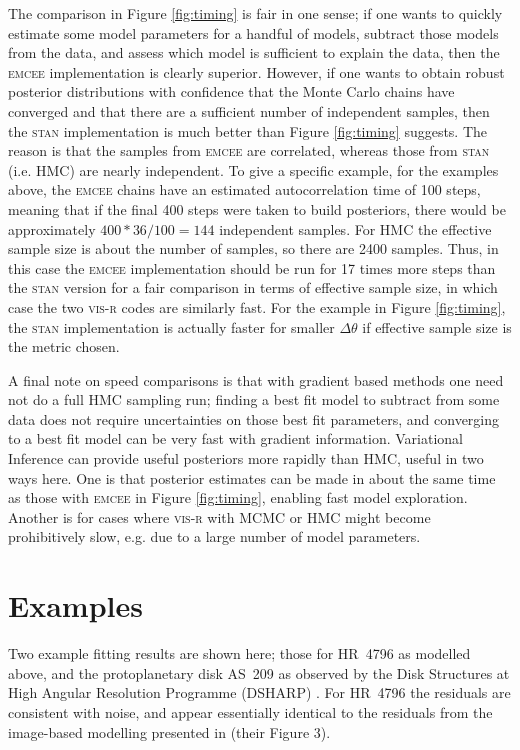 \documentclass[fleqn,usenatbib]{rasti}
\begin{document}
The comparison in Figure \ref{fig:timing} is fair in one sense; if one wants to quickly estimate some model parameters for a handful of models, subtract those models from the data, and assess which model is sufficient to explain the data, then the \textsc{emcee} implementation is clearly superior. However, if one wants to obtain robust posterior distributions with confidence that the Monte Carlo chains have converged and that there are a sufficient number of independent samples, then the \textsc{stan} implementation is much better than Figure \ref{fig:timing} suggests. The reason is that the samples from \textsc{emcee} are correlated, whereas those from \textsc{stan} (i.e. HMC) are nearly independent. To give a specific example, for the examples above, the \textsc{emcee} chains have an estimated autocorrelation time of 100 steps, meaning that if the final 400 steps were taken to build posteriors, there would be approximately $400*36/100=144$ independent samples. For HMC the effective sample size is about the number of samples, so there are 2400 samples. Thus, in this case the \textsc{emcee} implementation should be run for 17 times more steps than the \textsc{stan} version for a fair comparison in terms of effective sample size, in which case the two \textsc{vis-r} codes are similarly fast. For the example in Figure \ref{fig:timing}, the \textsc{stan} implementation is actually faster for smaller $\Delta \theta$ if effective sample size is the metric chosen.

A final note on speed comparisons is that with gradient based methods one need not do a full HMC sampling run; finding a best fit model to subtract from some data does not require uncertainties on those best fit parameters, and converging to a best fit model can be very fast with gradient information. Variational Inference can provide useful posteriors more rapidly than HMC, useful in two ways here. One is that posterior estimates can be made in about the same time as those with \textsc{emcee} in Figure \ref{fig:timing}, enabling fast model exploration. Another is for cases where \textsc{vis-r} with MCMC or HMC might become prohibitively slow, e.g. due to a large number of model parameters.

\section{Examples}

Two example fitting results are shown here; those for HR~4796 as modelled above, and the protoplanetary disk AS~209 as observed by the Disk Structures at High Angular Resolution Programme (DSHARP) \citep{2018ApJ...869L..48G}. For HR~4796 the residuals are consistent with noise, and appear essentially identical to the residuals from the image-based modelling presented in \citet{2018MNRAS.475.4924K} (their Figure 3).
\end{document}
